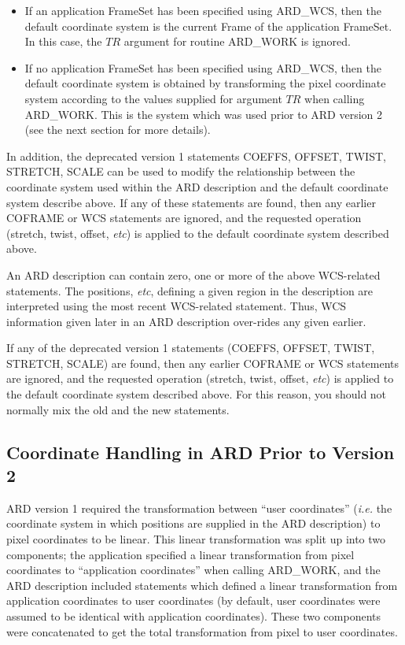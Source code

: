 \documentclass[11pt]{starlink}
\begin{document}
\begin{enumerate}
\begin{itemize}
\item If an application FrameSet has been specified using ARD\_WCS, then
the default coordinate system is the current Frame of the application
FrameSet. In this case, the $TR$ argument for routine ARD\_WORK is ignored.

\item If no application FrameSet has been specified using ARD\_WCS, then
the default coordinate system is obtained by transforming the pixel
coordinate system according to the values supplied for argument $TR$ when
calling ARD\_WORK. This is the system which was used prior to ARD version
2 (see the next section for more details).
\end{itemize}

In addition, the deprecated version 1 statements COEFFS, OFFSET, TWIST,
STRETCH, SCALE can be used to modify the relationship between the
coordinate system used within the ARD description and the default
coordinate system describe above. If any of these statements are found,
then any earlier COFRAME or WCS statements are ignored, and the requested
operation (stretch, twist, offset, \emph{etc}) is applied to the default
coordinate system described above.

\end{enumerate}

An ARD description can contain zero, one or more of the above WCS-related
statements. The positions, \emph{etc}, defining a given region in the
description are interpreted using the most recent WCS-related statement.
Thus, WCS information given later in an ARD description over-rides any
given earlier.

If any of the deprecated version 1 statements (COEFFS, OFFSET, TWIST,
STRETCH, SCALE) are found, then any earlier COFRAME or WCS statements are
ignored, and the requested operation (stretch, twist, offset, \emph{etc}) is
applied to the default coordinate system described above. For this
reason, you should not normally mix the old and the new statements.

\subsection{Coordinate Handling in ARD Prior to Version 2}

ARD version 1 required the transformation between ``user coordinates''
(\emph{i.e.} the coordinate system in which positions are supplied in the
ARD description) to pixel coordinates to be linear. This linear
transformation was split up into two components; the application specified
a linear transformation from pixel coordinates to ``application
coordinates'' when calling ARD\_WORK, and the ARD description included
statements which defined a linear transformation from application
coordinates to user coordinates (by default, user coordinates were
assumed to be identical with application coordinates). These two
components were concatenated to get the total transformation from pixel
to user coordinates.
\end{document}

